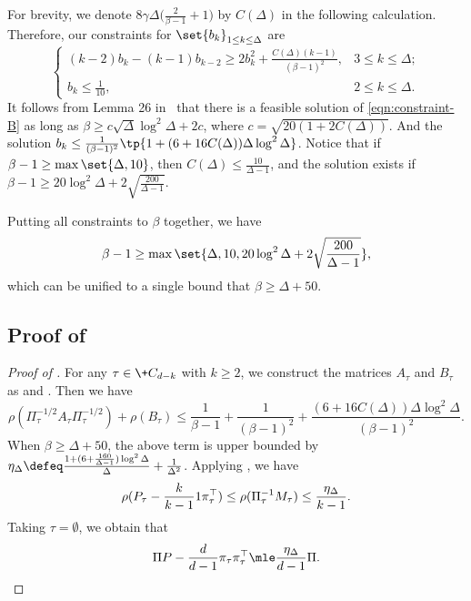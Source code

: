 For brevity, we denote ${8\gamma\Delta}\Big(\frac{2}{\beta-1} + 1\Big)$ by $C(\Delta)$ in the following calculation. Therefore, our constraints for $\set{b_k}_{1\leq k\leq \Delta}$ are
\begin{equation}
	\label{eqn:constraint-B}\tag{$\blacktriangle$}
	\begin{cases}
		(k-2) b_k - (k-1)b_{k-2} \ge 2b_k^2+\frac{C(\Delta)(k-1)}{(\beta-1)^2},& 3\le k\le \Delta; \\
		b_k \le \frac1{10}, & 2\le k\le \Delta.
	\end{cases}
\end{equation}
It follows from Lemma 26 in~\cite{WZZ24} that there is a feasible solution of \cref{eqn:constraint-B}
as long as $\beta\ge c\sqrt\Delta\log^2\Delta + 2c$, where $c = \sqrt{20(1+2C(\Delta))}$. And the solution $b_k \leq \frac{1}{(\beta-1)^2}\tp{1+(6+16 C(\Delta))\Delta \log^2 \Delta}$.
Notice that if $\beta - 1\ge \max\set{\Delta, 10}$, then $C(\Delta)\le \frac{10}{\Delta-1}$,
and the solution exists if $\beta - 1\ge 20\log^2\Delta+2\sqrt{\frac{200}{\Delta-1}}$.

Putting all constraints to $\beta$ together, we have
\[\beta-1\ge \max\set{\Delta, 10, 20\log^2\Delta+2\sqrt{\frac{200}{\Delta-1}}},\]
which can be unified to a single bound that $\beta\ge \Delta + 50$.

\subsection{Proof of }
\begin{proof}[Proof of ]
For any $\tau \in \+C_{d-k}$ with $k \geq 2$, we construct the matrices $A_\tau$ and $B_\tau$ as  and . Then we have
    \[ \rho(\Pi_\tau^{-1/2}A_\tau\Pi_\tau^{-1/2})+ \rho(B_\tau) \le \frac{1}{\beta-1}+\frac{1}{(\beta-1)^2} + \frac{(6+16 C(\Delta))\Delta \log^2\Delta}{(\beta-1)^2}.
    \]
When $\beta \geq \Delta + 50$, the above term is upper bounded by $\eta_\Delta \defeq \frac{1+(6+\frac{160}{\Delta-1})\log^2 \Delta}{\Delta}+\frac{1}{\Delta^2}$.
Applying , we have
\[
\rho( P_\tau -\frac{k}{k-1}\*{1} \pi_\tau^\top) \le \rho(\Pi_\tau^{-1} M_\tau) \le \frac{\eta_{\Delta}}{k-1}.
\]
Taking $\tau = \emptyset$, we obtain that
\[
\Pi P - \frac{d}{d-1} \pi_\tau \pi_\tau^\top \mle \frac{\eta_{\Delta}}{d-1}\Pi.
\]
\end{proof}
